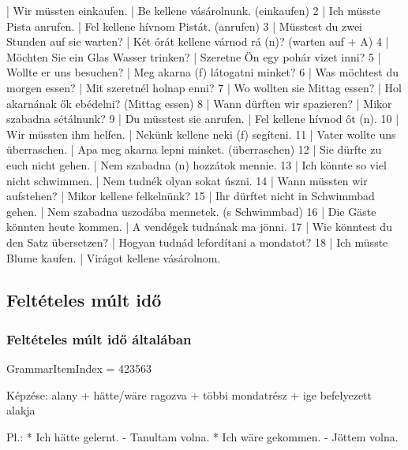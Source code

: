 \documentclass{article}
\newenvironment{desc}{\verbatim}{\endverbatim}
\newenvironment{exmp}{\verbatim}{\endverbatim}
\begin{document}
\begin{exmp}
1 | Wir müssten einkaufen. | Be kellene vásárolnunk. (einkaufen)
2 | Ich müsste Pista anrufen. | Fel kellene hívnom Pistát. (anrufen)
3 | Müsstest du zwei Stunden auf sie warten? | Két órát kellene várnod rá (n)? (warten auf + A)
4 | Möchten Sie ein Glas Wasser trinken? | Szeretne Ön egy pohár vizet inni?
5 | Wollte er uns besuchen? | Meg akarna (f) látogatni minket?
6 | Was möchtest du morgen essen? | Mit szeretnél holnap enni?
7 | Wo wollten sie Mittag essen? | Hol akarnának ők ebédelni? (Mittag essen)
8 | Wann dürften wir spazieren? | Mikor szabadna sétálnunk?
9 | Du müsstest sie anrufen. | Fel kellene hívnod őt (n).
10 | Wir müssten ihm helfen. | Nekünk kellene neki (f) segíteni.
11 | Vater wollte uns überraschen. | Apa meg akarna lepni minket. (überraschen)
12 | Sie dürfte zu euch nicht gehen. | Nem szabadna (n) hozzátok mennie.
13 | Ich könnte so viel nicht schwimmen. | Nem tudnék olyan sokat úszni.
14 | Wann müssten wir aufstehen? | Mikor kellene felkelnünk?
15 | Ihr dürftet nicht in Schwimmbad gehen. | Nem szabadna uszodába mennetek. (s Schwimmbad)
16 | Die Gäste könnten heute kommen. | A vendégek tudnának ma jönni.
17 | Wie könntest du den Satz übersetzen? | Hogyan tudnád lefordítani a mondatot?
18 | Ich müsste Blume kaufen. | Virágot kellene vásárolnom.
\end{exmp}

\subsection{Feltételes múlt idő}

\subsubsection{Feltételes múlt idő általában}

GrammarItemIndex = 423563

\begin{desc}
Képzése:
alany + hätte/wäre ragozva + többi mondatrész + ige befelyezett alakja

Pl.: * Ich hätte gelernt. - Tanultam volna.
* Ich wäre gekommen. - Jöttem volna.
\end{desc}
\end{document}
